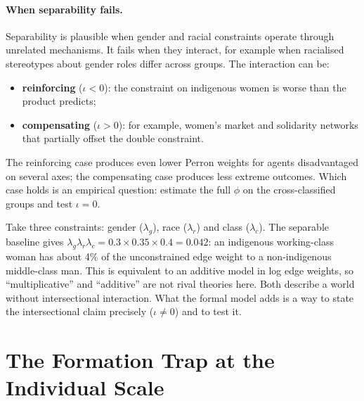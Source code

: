 \documentclass[../structural_economics_book.tex]{subfiles}
\begin{document}
\paragraph{When separability fails.} Separability is plausible when gender and racial constraints operate through unrelated mechanisms. It fails when they interact, for example when racialised stereotypes about gender roles differ across groups. The interaction can be:
\begin{itemize}
\item \textbf{reinforcing} ($\iota < 0$): the constraint on indigenous women is worse than the product predicts;
\item \textbf{compensating} ($\iota > 0$): for example, women's market and solidarity networks that partially offset the double constraint.
\end{itemize}
The reinforcing case produces even lower Perron weights for agents disadvantaged on several axes; the compensating case produces less extreme outcomes. Which case holds is an empirical question: estimate the full $\phi$ on the cross-classified groups and test $\iota = 0$.

\begin{intuition}
Take three constraints: gender ($\lambda_g$), race ($\lambda_r$) and class ($\lambda_c$). The separable baseline gives $\lambda_g \lambda_r \lambda_c = 0.3 \times 0.35 \times 0.4 = 0.042$: an indigenous working-class woman has about 4\% of the unconstrained edge weight to a non-indigenous middle-class man. This is equivalent to an additive model in log edge weights, so ``multiplicative'' and ``additive'' are not rival theories here. Both describe a world without intersectional interaction. What the formal model adds is a way to state the intersectional claim precisely ($\iota \ne 0$) and to test it.
\end{intuition}


\section{The Formation Trap at the Individual Scale}
\label{ch18:sec:formation_individual}
\end{document}
